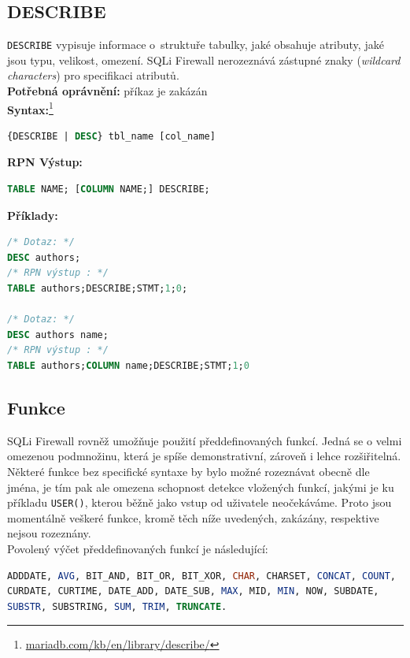 \subsection{DESCRIBE} \label{subsec:6:describe}
\texttt{DESCRIBE} vypisuje informace o~struktuře tabulky, jaké obsahuje atributy, jaké jsou typu, velikost, omezení. SQLi Firewall
nerozeznává zástupné znaky (\textit{wildcard characters}) pro specifikaci atributů. \\

\textbf{Potřebná oprávnění:} příkaz je zakázán \\

\textbf{Syntax:}\footnote{\url{mariadb.com/kb/en/library/describe/}}
\begin{lstlisting}[language=sql]
{DESCRIBE | DESC} tbl_name [col_name]
\end{lstlisting}
\vspace*{\baselineskip}
\textbf{RPN Výstup:}
\begin{lstlisting}[language=sql]
TABLE NAME; [COLUMN NAME;] DESCRIBE;
\end{lstlisting}
\vspace*{\baselineskip}
\textbf{Příklady:}
\begin{lstlisting}[language=sql]
/* Dotaz: */
DESC authors;
/* RPN výstup : */
TABLE authors;DESCRIBE;STMT;1;0;

/* Dotaz: */
DESC authors name;
/* RPN výstup : */
TABLE authors;COLUMN name;DESCRIBE;STMT;1;0
\end{lstlisting}
\newpage
\subsection{Funkce} \label{subsec:6:functions}
SQLi Firewall rovněž umožňuje použití předdefinovaných funkcí. Jedná se o velmi omezenou podmnožinu, která je spíše
demonstrativní, zároveň i lehce rozšiřitelná. Některé funkce bez specifické syntaxe by bylo možné rozeznávat obecně dle 
jména, je tím pak ale omezena schopnost detekce vložených funkcí, jakými je ku příkladu \texttt{USER()}, kterou běžně 
jako vstup od uživatele neočekáváme. Proto jsou momentálně veškeré funkce, kromě  těch níže uvedených, zakázány,
respektive nejsou rozeznány. \\

Povolený výčet předdefinovaných funkcí je následující:

\begin{lstlisting}[language=sql]
ADDDATE, AVG, BIT_AND, BIT_OR, BIT_XOR, CHAR, CHARSET, CONCAT, COUNT, 
CURDATE, CURTIME, DATE_ADD, DATE_SUB, MAX, MID, MIN, NOW, SUBDATE, 
SUBSTR, SUBSTRING, SUM, TRIM, TRUNCATE. 
\end{lstlisting}

